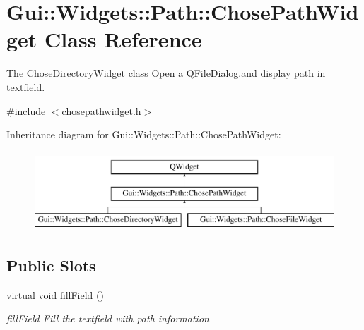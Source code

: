\hypertarget{classGui_1_1Widgets_1_1Path_1_1ChosePathWidget}{}\section{Gui\+:\+:Widgets\+:\+:Path\+:\+:Chose\+Path\+Widget Class Reference}
\label{classGui_1_1Widgets_1_1Path_1_1ChosePathWidget}


The \hyperlink{classGui_1_1Widgets_1_1Path_1_1ChoseDirectoryWidget}{Chose\+Directory\+Widget} class Open a Q\+File\+Dialog.\+and display path in textfield.  




{\ttfamily \#include $<$chosepathwidget.\+h$>$}

Inheritance diagram for Gui\+:\+:Widgets\+:\+:Path\+:\+:Chose\+Path\+Widget\+:\begin{figure}[H]
\begin{center}
\leavevmode
\includegraphics[height=3.000000cm]{db/de6/classGui_1_1Widgets_1_1Path_1_1ChosePathWidget}
\end{center}
\end{figure}
\subsection*{Public Slots}
\begin{DoxyCompactItemize}
\item 
\hypertarget{classGui_1_1Widgets_1_1Path_1_1ChosePathWidget_aea561fda3f9be03e9454f7af62683da7}{}virtual void \hyperlink{classGui_1_1Widgets_1_1Path_1_1ChosePathWidget_aea561fda3f9be03e9454f7af62683da7}{fill\+Field} ()\label{classGui_1_1Widgets_1_1Path_1_1ChosePathWidget_aea561fda3f9be03e9454f7af62683da7}

\begin{DoxyCompactList}\small\item\em fill\+Field Fill the textfield with path information \end{DoxyCompactList}\end{DoxyCompactItemize}
